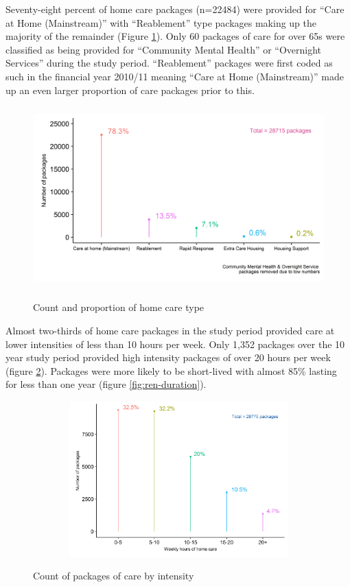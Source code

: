 \documentclass[]{article}
\begin{document}
Seventy-eight percent of home care packages (n=22484) were provided for
``Care at Home (Mainstream)'' with ``Reablement'' type packages making
up the majority of the remainder (Figure \ref{fig:ren-type}). Only 60
packages of care for over 65s were classified as being provided for
``Community Mental Health'' or ``Overnight Services'' during the study
period. ``Reablement'' packages were first coded as such in the
financial year 2010/11 meaning ``Care at Home (Mainstream)'' made up an
even larger proportion of care packages prior to this.

\begin{figure}[]
  \centering
    \caption{Count and proportion of home care type}
    \includegraphics[height = 7cm, width = 12cm]{figures/chapter-renf/02-pack-plot}
    \label{fig:ren-type}
\end{figure}

Almost two-thirds of home care packages in the study period provided
care at lower intensities of less than 10 hours per week. Only 1,352
packages over the 10 year study period provided high intensity packages
of over 20 hours per week (figure \ref{fig:ren-hrs}). Packages were more
likely to be short-lived with almost 85\% lasting for less than one year
(figure \ref{fig:ren-duration}).

\begin{figure}[h]
  \centering
    \caption{Count of packages of care by intensity}
    \includegraphics[height = 6cm, width = 14cm]{figures/chapter-renf/03-hrs-plot-ts-subset.png}
    \label{fig:ren-hrs}
\end{figure}
\end{document}
